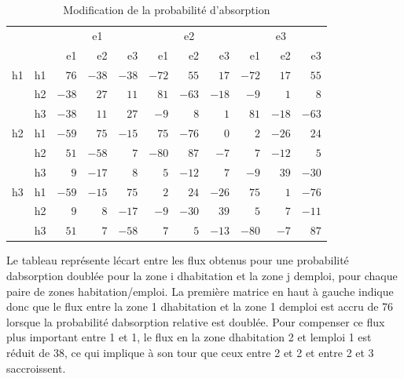 \documentclass[
  10pt,
  a4paper,
  numbers=noendperiod,
  DIV=9]{scrartcl}
\begin{document}
\hypertarget{tbl-fluxpond}{}
\setlength{\LTpost}{0mm}
\begin{longtable}{l|lrrrrrrrrr}
\caption{\label{tbl-fluxpond}Modification de la probabilité d'absorption }\tabularnewline

\toprule
\multicolumn{1}{l}{} &  & \multicolumn{3}{c}{e1} & \multicolumn{3}{c}{e2} & \multicolumn{3}{c}{e3} \\ 
\cmidrule(lr){3-5} \cmidrule(lr){6-8} \cmidrule(lr){9-11}
\multicolumn{1}{l}{} &  & e1 & e2 & e3 & e1 & e2 & e3 & e1 & e2 & e3 \\ 
\midrule
h1 & h1 & $76$ & $-38$ & $-38$ & $-72$ & $55$ & $17$ & $-72$ & $17$ & $55$ \\ 
 & h2 & $-38$ & $27$ & $11$ & $81$ & $-63$ & $-18$ & $-9$ & $1$ & $8$ \\ 
 & h3 & $-38$ & $11$ & $27$ & $-9$ & $8$ & $1$ & $81$ & $-18$ & $-63$ \\ 
\midrule
h2 & h1 & $-59$ & $75$ & $-15$ & $75$ & $-76$ & $0$ & $2$ & $-26$ & $24$ \\ 
 & h2 & $51$ & $-58$ & $7$ & $-80$ & $87$ & $-7$ & $7$ & $-12$ & $5$ \\ 
 & h3 & $9$ & $-17$ & $8$ & $5$ & $-12$ & $7$ & $-9$ & $39$ & $-30$ \\ 
\midrule
h3 & h1 & $-59$ & $-15$ & $75$ & $2$ & $24$ & $-26$ & $75$ & $1$ & $-76$ \\ 
 & h2 & $9$ & $8$ & $-17$ & $-9$ & $-30$ & $39$ & $5$ & $7$ & $-11$ \\ 
 & h3 & $51$ & $7$ & $-58$ & $7$ & $5$ & $-13$ & $-80$ & $-7$ & $87$ \\ 
\bottomrule
\end{longtable}
\begin{minipage}{\linewidth}
Le tableau représente l\textquotesingle{}écart entre les flux obtenus pour une probabilité d\textquotesingle{}absorption doublée
pour la zone i d\textquotesingle{}habitation et la zone j d\textquotesingle{}emploi, pour chaque paire de zones habitation/emploi.
La première matrice en haut à gauche indique donc que le flux entre la zone 1 d\textquotesingle{}habitation et
la zone 1 d\textquotesingle{}emploi est accru de 76 lorsque la probabilité d\textquotesingle{}absorption relative est doublée.
Pour compenser ce flux plus important entre 1 et 1, le flux en la zone d\textquotesingle{}habitation 2 et l\textquotesingle{}emploi 1 est réduit de 38,
ce qui implique à son tour que ceux entre 2 et 2 et entre 2 et 3 s\textquotesingle{}accroissent.\\
\end{minipage}
\end{document}
